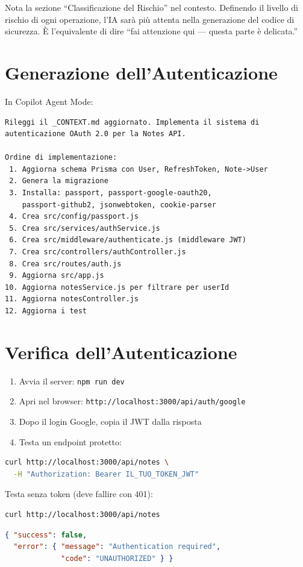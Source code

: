 \begin{notebox}
Nota la sezione ``Classificazione del Rischio'' nel contesto. Definendo il livello di rischio di ogni operazione, l'IA sarà più attenta nella generazione del codice di sicurezza. È l'equivalente di dire ``fai attenzione qui --- questa parte è delicata.''
\end{notebox}

\section{Generazione dell'Autenticazione}

\begin{praticabox}[title={Pratica --- Implementazione}]
In Copilot Agent Mode:
\begin{lstlisting}[language={}]
Rileggi il _CONTEXT.md aggiornato. Implementa il sistema di
autenticazione OAuth 2.0 per la Notes API.

Ordine di implementazione:
 1. Aggiorna schema Prisma con User, RefreshToken, Note->User
 2. Genera la migrazione
 3. Installa: passport, passport-google-oauth20,
    passport-github2, jsonwebtoken, cookie-parser
 4. Crea src/config/passport.js
 5. Crea src/services/authService.js
 6. Crea src/middleware/authenticate.js (middleware JWT)
 7. Crea src/controllers/authController.js
 8. Crea src/routes/auth.js
 9. Aggiorna src/app.js
10. Aggiorna notesService.js per filtrare per userId
11. Aggiorna notesController.js
12. Aggiorna i test
\end{lstlisting}
\end{praticabox}

\section{Verifica dell'Autenticazione}

\begin{praticabox}[title={Pratica --- Test del flusso OAuth}]
\begin{enumerate}
  \item Avvia il server: \texttt{npm run dev}
  \item Apri nel browser: \texttt{http://localhost:3000/api/auth/google}
  \item Dopo il login Google, copia il JWT dalla risposta
  \item Testa un endpoint protetto:
\end{enumerate}
\begin{lstlisting}[language=bash]
curl http://localhost:3000/api/notes \
  -H "Authorization: Bearer IL_TUO_TOKEN_JWT"
\end{lstlisting}
Testa senza token (deve fallire con 401):
\begin{lstlisting}[language=bash]
curl http://localhost:3000/api/notes
\end{lstlisting}
\begin{lstlisting}[language=json]
{ "success": false,
  "error": { "message": "Authentication required",
             "code": "UNAUTHORIZED" } }
\end{lstlisting}
\end{praticabox}

